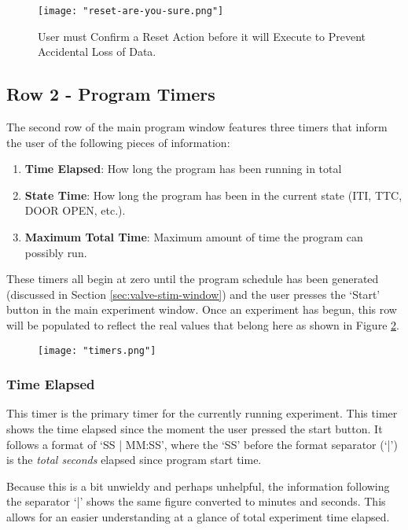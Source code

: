 \documentclass{article}
\begin{document}
\begin{figure}[h!]
        \centering
        \texttt{[image: "reset-are-you-sure.png"]}
        \caption{User must Confirm a Reset Action before it will Execute to Prevent Accidental Loss of Data.}
        \label{fig:reset-confirm}
\end{figure}
\FloatBarrier

\newpage
\subsection{Row 2 - Program Timers}
The second row of the main program window features three timers that inform the user of the following pieces of information:
\begin{enumerate}
    \item \textbf{Time Elapsed}: How long the program has been running in total
    \item \textbf{State Time}: How long the program has been in the current state (ITI, TTC, DOOR OPEN, etc.).
    \item \textbf{Maximum Total Time}: Maximum amount of time the program can possibly run.
\end{enumerate}

These timers all begin at zero until the program schedule has been generated (discussed in Section \ref{sec:valve-stim-window}) and the user 
presses the `Start' button in the main experiment window. Once an experiment has begun, this row will be populated to reflect the real values 
that belong here as shown in Figure \ref{fig:timers}.

\begin{figure}[h!]
        \centering
        \texttt{[image: "timers.png"]}
        \caption{}
        \label{fig:timers}
\end{figure}
\FloatBarrier

\newpage
\subsubsection{Time Elapsed}
This timer is the primary timer for the currently running experiment. This timer shows the time elapsed since the moment the user pressed the start button. It follows a format
of `SS | MM:SS', where the `SS' before the format separator (`|') is the \textit{total seconds} elapsed since program start time. 

Because this is a bit unwieldy and perhaps unhelpful, the information following the separator `|' shows the same figure converted to minutes 
and seconds. This allows for an easier understanding at a glance of total experiment time elapsed.
\end{document}
